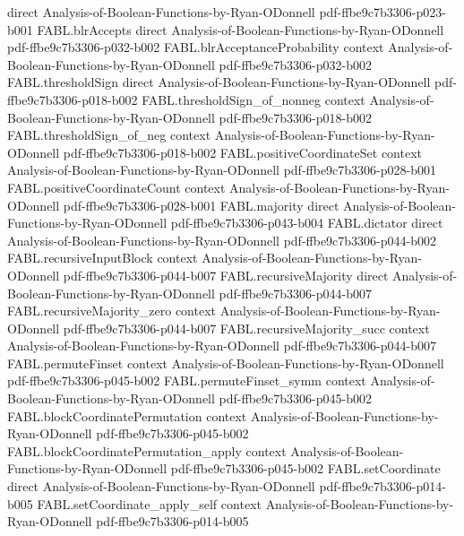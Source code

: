\begin{theorem}
  {direct}
  {Analysis-of-Boolean-Functions-by-Ryan-ODonnell}
  {pdf-ffbe9c7b3306-p023-b001}
\proofstep
  {FABL.blrAccepts}
  {direct}
  {Analysis-of-Boolean-Functions-by-Ryan-ODonnell}
  {pdf-ffbe9c7b3306-p032-b002}
\proofstep
  {FABL.blrAcceptanceProbability}
  {context}
  {Analysis-of-Boolean-Functions-by-Ryan-ODonnell}
  {pdf-ffbe9c7b3306-p032-b002}
\proofstep
  {FABL.thresholdSign}
  {direct}
  {Analysis-of-Boolean-Functions-by-Ryan-ODonnell}
  {pdf-ffbe9c7b3306-p018-b002}
\proofstep
  {FABL.thresholdSign_of_nonneg}
  {context}
  {Analysis-of-Boolean-Functions-by-Ryan-ODonnell}
  {pdf-ffbe9c7b3306-p018-b002}
\proofstep
  {FABL.thresholdSign_of_neg}
  {context}
  {Analysis-of-Boolean-Functions-by-Ryan-ODonnell}
  {pdf-ffbe9c7b3306-p018-b002}
\proofstep
  {FABL.positiveCoordinateSet}
  {context}
  {Analysis-of-Boolean-Functions-by-Ryan-ODonnell}
  {pdf-ffbe9c7b3306-p028-b001}
\proofstep
  {FABL.positiveCoordinateCount}
  {context}
  {Analysis-of-Boolean-Functions-by-Ryan-ODonnell}
  {pdf-ffbe9c7b3306-p028-b001}
\proofstep
  {FABL.majority}
  {direct}
  {Analysis-of-Boolean-Functions-by-Ryan-ODonnell}
  {pdf-ffbe9c7b3306-p043-b004}
\proofstep
  {FABL.dictator}
  {direct}
  {Analysis-of-Boolean-Functions-by-Ryan-ODonnell}
  {pdf-ffbe9c7b3306-p044-b002}
\proofstep
  {FABL.recursiveInputBlock}
  {context}
  {Analysis-of-Boolean-Functions-by-Ryan-ODonnell}
  {pdf-ffbe9c7b3306-p044-b007}
\proofstep
  {FABL.recursiveMajority}
  {direct}
  {Analysis-of-Boolean-Functions-by-Ryan-ODonnell}
  {pdf-ffbe9c7b3306-p044-b007}
\proofstep
  {FABL.recursiveMajority_zero}
  {context}
  {Analysis-of-Boolean-Functions-by-Ryan-ODonnell}
  {pdf-ffbe9c7b3306-p044-b007}
\proofstep
  {FABL.recursiveMajority_succ}
  {context}
  {Analysis-of-Boolean-Functions-by-Ryan-ODonnell}
  {pdf-ffbe9c7b3306-p044-b007}
\proofstep
  {FABL.permuteFinset}
  {context}
  {Analysis-of-Boolean-Functions-by-Ryan-ODonnell}
  {pdf-ffbe9c7b3306-p045-b002}
\proofstep
  {FABL.permuteFinset_symm}
  {context}
  {Analysis-of-Boolean-Functions-by-Ryan-ODonnell}
  {pdf-ffbe9c7b3306-p045-b002}
\proofstep
  {FABL.blockCoordinatePermutation}
  {context}
  {Analysis-of-Boolean-Functions-by-Ryan-ODonnell}
  {pdf-ffbe9c7b3306-p045-b002}
\proofstep
  {FABL.blockCoordinatePermutation_apply}
  {context}
  {Analysis-of-Boolean-Functions-by-Ryan-ODonnell}
  {pdf-ffbe9c7b3306-p045-b002}
\proofstep
  {FABL.setCoordinate}
  {direct}
  {Analysis-of-Boolean-Functions-by-Ryan-ODonnell}
  {pdf-ffbe9c7b3306-p014-b005}
\proofstep
  {FABL.setCoordinate_apply_self}
  {context}
  {Analysis-of-Boolean-Functions-by-Ryan-ODonnell}
  {pdf-ffbe9c7b3306-p014-b005}

\end{theorem}

